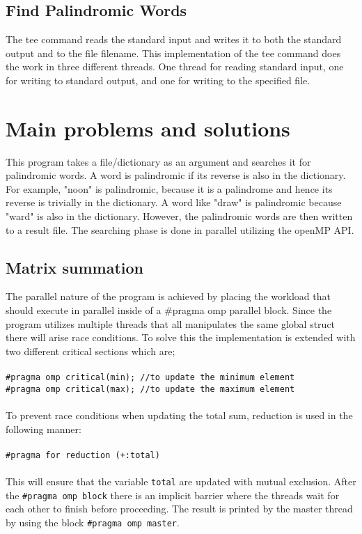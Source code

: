 \documentclass{article}
\begin{document}
\subsection{Find Palindromic Words}

The tee command reads the standard input and writes it to both the standard output and to the file filename. This implementation of the tee command does the work in three different threads. One thread for reading standard input, one for writing to standard output, and one for writing to the specified file.

\section{Main problems and solutions}

This program takes a file/dictionary as an argument and searches it for palindromic words. A word is palindromic if its reverse is also in the dictionary. For example, "noon" is palindromic, because it is a palindrome and hence its reverse is trivially in the dictionary. A word like "draw" is palindromic because "ward" is also in the dictionary. However,  the palindromic words are then written to a result file. The searching phase is done in parallel utilizing the openMP API.  


\subsection{Matrix summation}

The parallel nature of the program is achieved by placing the workload that should execute in parallel inside of a #pragma omp parallel block. Since the program utilizes multiple threads that all manipulates the same global struct there will arise race conditions. To solve this the implementation is extended with two different critical sections which are; \\\\
\texttt{#pragma omp critical(min);      //to update the minimum element}\\
\texttt{#pragma omp critical(max);      //to update the maximum element}
\\\\To prevent race conditions when updating the total sum, reduction is used in the following manner: 
\\\\\texttt{#pragma for reduction (+:total)}
\\\\This will ensure that the variable \texttt{total} are updated with mutual exclusion. After the \texttt{#pragma omp block} there is an implicit barrier where the threads wait for each other to finish before proceeding. The result is printed by the master thread by using the block \texttt{#pragma omp master}.  
\end{document}
